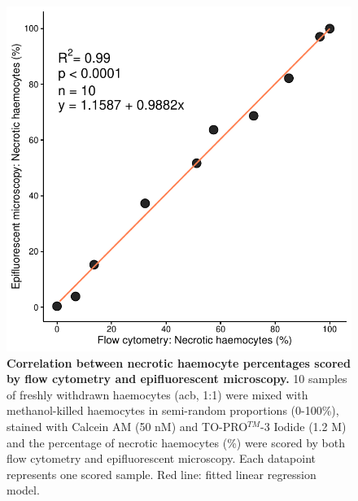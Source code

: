 \begin{figure}[ht!]
    \centering
    \includegraphics[width=.5\textwidth]{figures/Method development/FCM EM linreg final.pdf}
    \caption{\textbf{Correlation between necrotic haemocyte percentages scored by flow cytometry and epifluorescent microscopy.} 10 samples of freshly withdrawn haemocytes (\acrshort{acb}, 1:1) were mixed with methanol-killed haemocytes in semi-random proportions (0-100\%), stained with Calcein AM (50 nM) and TO-PRO$^{TM}$-3 Iodide (1.2 \micro M) and the percentage of necrotic haemocytes (\%) were scored by both flow cytometry and epifluorescent microscopy. Each datapoint represents one scored sample. Red line: fitted linear regression model.}
    \label{fig:method_val_1}
\end{figure}

